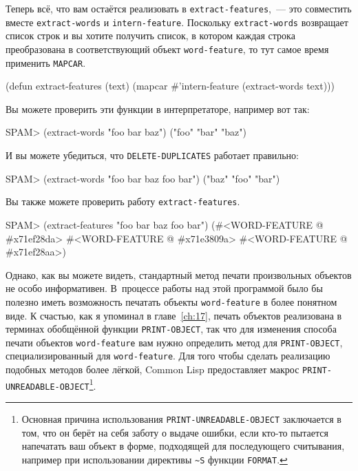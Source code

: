 Теперь всё, что вам остаётся реализовать в \lstinline{extract-features},~--- это совместить
вместе \lstinline{extract-words} и \lstinline{intern-feature}.  Поскольку \lstinline{extract-words}
возвращает список строк и вы хотите получить список, в котором каждая строка преобразована
в соответствующий объект \lstinline{word-feature}, то тут самое время применить \lstinline{MAPCAR}.

\begin{myverb}
(defun extract-features (text)
  (mapcar #'intern-feature (extract-words text)))
\end{myverb}

Вы можете проверить эти функции в интерпретаторе, например вот так:

\begin{myverb}
SPAM> (extract-words "foo bar baz")
("foo" "bar" "baz")
\end{myverb}

И вы можете убедиться, что \lstinline{DELETE-DUPLICATES} работает правильно:

\begin{myverb}
SPAM> (extract-words "foo bar baz foo bar")
("baz" "foo" "bar")
\end{myverb}

Вы также можете проверить работу \lstinline{extract-features}.

\begin{myverb}
SPAM> (extract-features "foo bar baz foo bar")
(#<WORD-FEATURE @ #x71ef28da> #<WORD-FEATURE @ #x71e3809a>
 #<WORD-FEATURE @ #x71ef28aa>)
\end{myverb}

Однако, как вы можете видеть, стандартный метод печати произвольных объектов не особо
информативен.  В~процессе работы над этой программой было бы полезно иметь возможность
печатать объекты \lstinline{word-feature} в более понятном виде.  К счастью, как я упоминал в
главе~\ref{ch:17}, печать объектов реализована в терминах обобщённой функции
\lstinline{PRINT-OBJECT}, так что для изменения способа печати объектов \lstinline{word-feature} вам
нужно определить метод для \lstinline{PRINT-OBJECT}, специализированный для
\lstinline{word-feature}.  Для того чтобы сделать реализацию подобных методов более лёгкой,
Common Lisp предоставляет макрос \lstinline{PRINT-UNREADABLE-OBJECT}\footnote{Основная причина
  использования \lstinline{PRINT-UNREADABLE-OBJECT} заключается в том, что он берёт на себя
  заботу о выдаче ошибки, если кто-то пытается напечатать ваш объект в форме, подходящей
  для последующего считывания, например при использовании директивы \lstinline{~S} функции
  \lstinline{FORMAT}.}\hspace{\footnotenegspace}.

